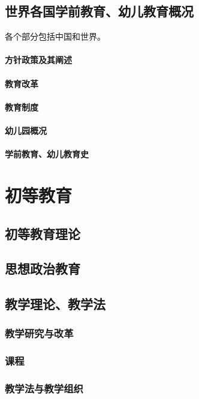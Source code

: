 \documentclass[UTF8]{../../ApplicationUniverse}
\begin{document}
\section{世界各国学前教育、幼儿教育概况}
各个部分包括中国和世界。

\subsubsection{方针政策及其阐述}
\subsubsection{教育改革}
\subsubsection{教育制度}
\subsubsection{幼儿园概况}
\subsubsection{学前教育、幼儿教育史}





\chapter{初等教育}
\section{初等教育理论}
\section{思想政治教育}
\section{教学理论、教学法}
    \subsection{教学研究与改革}
    \subsection{课程}
    \subsection{教学法与教学组织}
\end{document}
